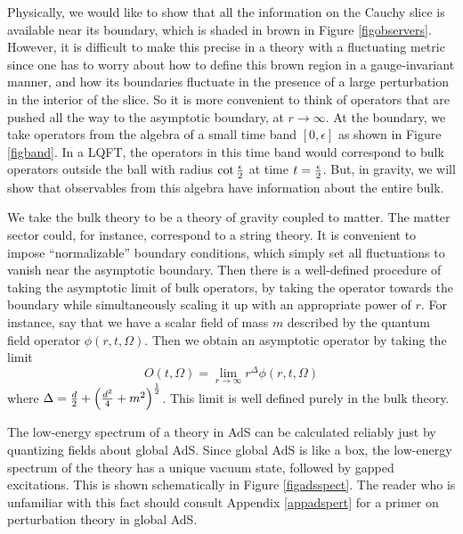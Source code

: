 \documentclass[12pt]{article}
\newcommand{\be}{\begin{equation}}
\newcommand{\ee}{\end{equation}}
\begin{document}
Physically, we would like to show that all the information on the Cauchy slice is available near its boundary, which is shaded in brown in Figure \ref{figobservers}. However, it is difficult to make this precise in a theory with a fluctuating metric since one has to worry about how to define this brown region in a gauge-invariant manner, and how its boundaries fluctuate in the presence of a large perturbation in the interior of the slice. So it is more convenient to think of operators that are pushed all the way to the asymptotic boundary, at 
$r \rightarrow \infty$. At the boundary, we take operators from the algebra of a small time band $[0, \epsilon]$ as shown in Figure \ref{figband}.   In a LQFT, the operators in this time band would correspond to bulk operators outside the ball with radius $\cot{{\epsilon \over 2}}$ at time  $t = {\epsilon \over 2}$. But, in gravity, we will show that observables from this algebra have information about the entire bulk.

We take the bulk theory to be a theory of gravity coupled to matter.  The matter sector could, for instance, correspond to a string theory. It is convenient to impose ``normalizable'' boundary conditions, which simply set all fluctuations to vanish near the asymptotic boundary. Then there is a well-defined procedure of taking the asymptotic limit of bulk operators, by taking the operator towards the boundary while simultaneously scaling it up with an appropriate power of $r$. 
For instance, say that we have a scalar field of mass $m$ described by the quantum field operator $\phi(r,t, \Omega)$. Then we obtain an asymptotic operator by taking the limit 
\be
O(t, \Omega) = \lim_{r \rightarrow \infty} r^{\Delta} \phi(r, t, \Omega)
\ee
where $\Delta = {d \over 2} + \left({d^2 \over 4} + m^2 \right)^{1 \over 2}$. This limit is well defined purely in the bulk theory.





The low-energy spectrum of a theory in AdS can be calculated reliably just by quantizing fields about global AdS. Since global AdS is like a box, the low-energy spectrum of the theory has a unique vacuum state, followed by gapped excitations. This is shown schematically in Figure \ref{figadsspect}. The reader who is unfamiliar with this fact should consult Appendix \ref{appadspert} for a primer on perturbation theory in global AdS.
\end{document}
